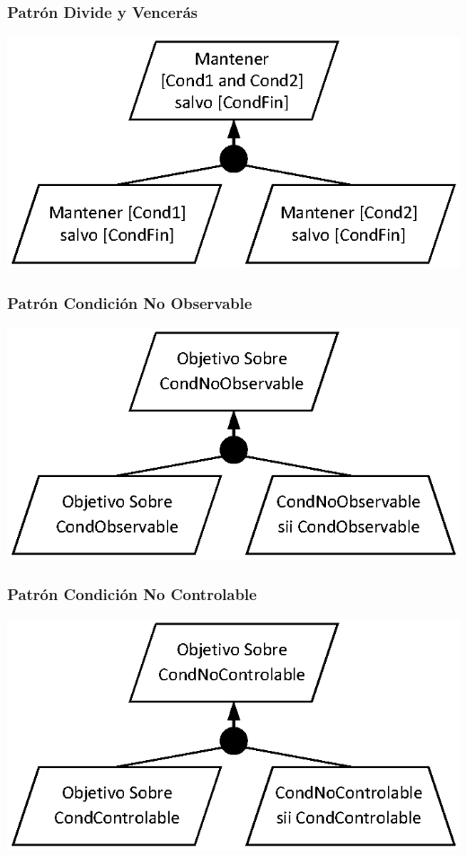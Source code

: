 \documentclass[slidestop,xcolor=pst,dvips,blue]{beamer}
\begin{document}
\begin{frame}[c]
    \frametitle{Patrón Divide y Vencerás}
    \begin{center}
        \includegraphics[width=0.70\linewidth,keepaspectratio=true]{images/objetivos/divideAndConquerPattern.eps}
    \end{center}
\end{frame}

\begin{frame}[c]
    \frametitle{Patrón Condición No Observable}
    \begin{center}
        \includegraphics[width=0.70\linewidth,keepaspectratio=true]{images/objetivos/unmonitorabilityPattern.eps}
    \end{center}
\end{frame}

\begin{frame}[c]
    \frametitle{Patrón Condición No Controlable}
    \begin{center}
        \includegraphics[width=0.70\linewidth,keepaspectratio=true]{images/objetivos/uncontrolabilityPattern.eps}
    \end{center}
\end{frame}
\end{document}
